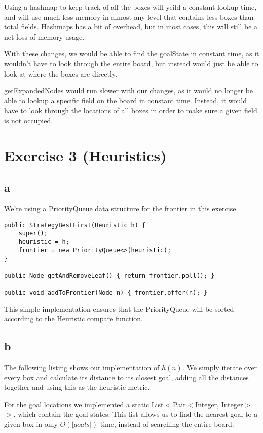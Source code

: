 \documentclass[12pt]{article}
\begin{document}
Using a hashmap to keep track of all the boxes will yeild a constant lookup time, and will use much less memory in almost any level that contains less boxes than total fields. Hashmaps has a bit of overhead, but in most cases, this will still be a net loss of memory usage.

With these changes, we would be able to find the goalState in constant time, as it wouldn't have to look through the entire board, but instead would just be able to look at where the boxes are directly.

getExpandedNodes would run slower with our changes, as it would no longer be able to lookup a specific field on the board in constant time. Instead, it would have to look through the locations of all boxes in order to make sure a given field is not occupied.


\section{Exercise 3 (Heuristics)}
\label{sec:Exercise 3 (Heuristics)}

\subsection{a}
\label{sub:a}

We're using a PriorityQueue data structure for the frontier in this exercise.

\begin{lstlisting}
public StrategyBestFirst(Heuristic h) {
    super();
    heuristic = h;
    frontier = new PriorityQueue<>(heuristic);
}

public Node getAndRemoveLeaf() { return frontier.poll(); }

public void addToFrontier(Node n) { frontier.offer(n); }
\end{lstlisting}

This simple implementation ensures that the PriorityQueue will be sorted according to the Heuristic compare function.

\subsection{b}
\label{sub:b}

The following listing shows our implementation of $h(n)$. We simply iterate over every box and calculate its distance to its closest goal, adding all the distances together and using this as the heuristic metric.

For the goal locations we implemented a static List$<$Pair$<$Integer, Integer$>$$>$, which contain the goal states. This list allows us to find the nearest goal to a given box in only $O(|goals|)$ time, instead of searching the entire board.
\end{document}
